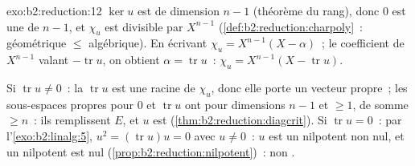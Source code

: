 \begin{solution}{exo:b2:reduction:12}
$\ker u$ est de dimension $n - 1$ (théorème du rang), donc $0$ est une
 de  $n - 1$, et $\chi_u$ est
divisible par $X^{n-1}$
(\cref{def:b2:reduction:charpoly}~: géométrique $\leq$ algébrique). En
écrivant $\chi_u = X^{n-1}(X - \alpha)$~; le coefficient de $X^{n-1}$
valant $-\operatorname{tr} u$, on obtient $\alpha =
\operatorname{tr} u$~: $\chi_u = X^{n-1}(X - \operatorname{tr} u)$.

Si $\operatorname{tr} u \neq 0$~: la  $\operatorname{tr}
u$ est une racine de $\chi_u$, donc elle porte un vecteur propre~; les
sous-espaces propres pour $0$ et $\operatorname{tr} u$ ont pour
dimensions $n - 1$ et $\geq 1$, de somme $\geq n$~: ils remplissent
$E$, et $u$ est 
(\cref{thm:b2:reduction:diagcrit}). Si $\operatorname{tr} u = 0$~: par
l'\cref{exo:b2:linalg:5}, $u^2 = (\operatorname{tr} u)u = 0$ avec $u
\neq 0$~: $u$ est un nilpotent non nul, et un nilpotent 
est nul (\cref{prop:b2:reduction:nilpotent})~: non .
\end{solution}

